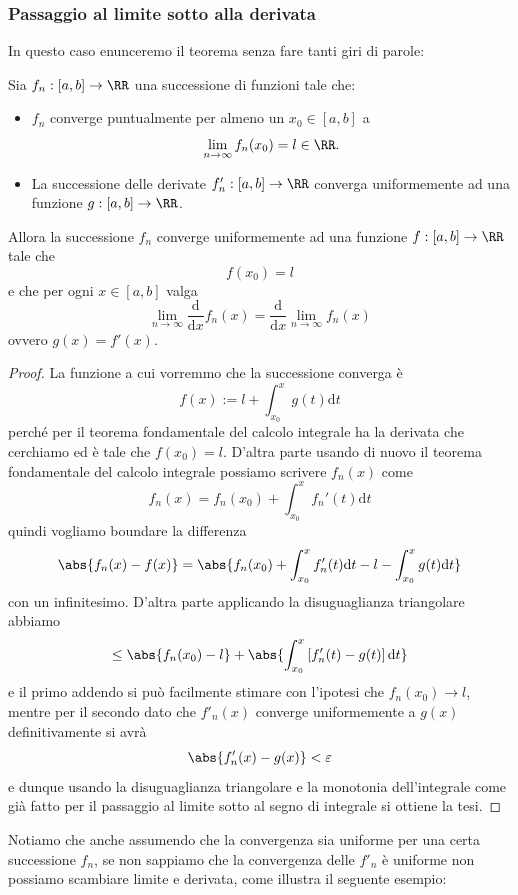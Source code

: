 \documentclass[11pt]{scrartcl}
\newcommand{\dif}{\text{d}}
\begin{document}
	\subsubsection{Passaggio al limite sotto alla derivata}
	In questo caso enunceremo il teorema senza fare tanti giri di parole:
	\begin{theorem}
		Sia $f_n:[a,b]\to\RR$ una successione di funzioni tale che:
		\begin{itemize}
			\item $f_n$ converge puntualmente per almeno un $x_0\in [a,b]$ a 
			$$\lim_{n\to\infty}f_n(x_0)=l\in\RR.$$
			\item La successione delle derivate $f'_n:[a,b]\to\RR$ converga uniformemente ad una funzione $g:[a,b]\to\RR$.
		\end{itemize}
		Allora la successione $f_n$ converge uniformemente ad una funzione $f:[a,b]\to\RR$ tale che
		$$f(x_0)=l$$
		e che per ogni $x\in [a,b]$ valga
		$$\lim_{n\to\infty}\frac{\dif}{\dif x}f_n(x)=\frac{\dif}{\dif x}\lim_{n\to\infty}f_n(x)$$
		ovvero $g(x)=f'(x)$.
	\end{theorem}
	\begin{proof}
		La funzione a cui vorremmo che la successione converga è
		$$f(x):=l+\int_{x_0}^x g(t)\dif t$$
		perché per il teorema fondamentale del calcolo integrale ha la derivata che cerchiamo ed è tale che $f(x_0)=l$. D'altra parte usando di nuovo il teorema fondamentale del calcolo integrale possiamo scrivere $f_n(x)$ come
		$$f_n(x)=f_n(x_0)+\int_{x_0}^x f_n'(t)\dif t$$
		quindi vogliamo boundare la differenza 
		$$\abs{f_n(x)-f(x)}=\abs{f_n(x_0)+\int_{x_0}^x f_n'(t)\dif t-l-\int_{x_0}^x g(t)\dif t}$$
		con un infinitesimo. D'altra parte applicando la disuguaglianza triangolare abbiamo
		$$\le \abs{f_n(x_0)-l}+\abs{\int_{x_0}^x \left[f_n'(t)-g(t)\right]\dif t}$$
		e il primo addendo si può facilmente stimare con l'ipotesi che $f_n(x_0)\to l$, mentre per il secondo dato che $f'_n(x)$ converge uniformemente a $g(x)$ definitivamente si avrà 
		$$\abs{f_n'(x)-g(x)}<\varepsilon$$
		e dunque usando la disuguaglianza triangolare e la monotonia dell'integrale come già fatto per il passaggio al limite sotto al segno di integrale si ottiene la tesi.
	\end{proof}
	Notiamo che anche assumendo che la convergenza sia uniforme per una certa successione $f_n$, se non sappiamo che la convergenza delle $f'_n$ è uniforme non possiamo scambiare limite e derivata, come illustra il seguente esempio:
\end{document}
